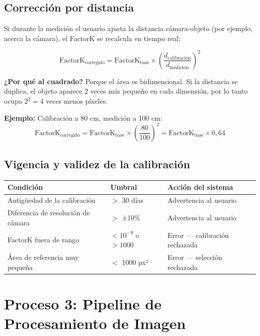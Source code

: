 \documentclass[12pt, a4paper]{article}
\begin{document}
\subsection{Corrección por distancia}

Si durante la medición el usuario ajusta la distancia cámara-objeto
(por ejemplo, acerca la cámara), el FactorK se recalcula en tiempo real:

\begin{formulabox}[title=Corrección cuadrática por distancia]
$$\text{FactorK}_{\text{corregido}} = \text{FactorK}_{\text{base}}
  \times \left(\frac{d_{\text{calibración}}}{d_{\text{medición}}}\right)^2$$

\textbf{¿Por qué al cuadrado?} Porque el área es bidimensional.
Si la distancia se duplica, el objeto aparece 2 veces más pequeño en cada dimensión,
por lo tanto ocupa $2^2 = 4$ veces menos píxeles.
\end{formulabox}

\vspace{0.3cm}

\textbf{Ejemplo:} Calibración a 80 cm, medición a 100 cm:
$$\text{FactorK}_{\text{corregido}} = \text{FactorK}_{\text{base}} \times \left(\frac{80}{100}\right)^2 = \text{FactorK}_{\text{base}} \times 0{,}64$$

\subsection{Vigencia y validez de la calibración}

\begin{center}
\begin{tabular}{lll}
\toprule
\textbf{Condición} & \textbf{Umbral} & \textbf{Acción del sistema} \\
\midrule
Antigüedad de la calibración & $>$ 30 días & Advertencia al usuario \\
Diferencia de resolución de cámara & $>$ ±10\% & Advertencia al usuario \\
FactorK fuera de rango & $<10^{-9}$ o $>1000$ & Error — calibración rechazada \\
Área de referencia muy pequeña & $<$ 1000 px² & Error — selección rechazada \\
\bottomrule
\end{tabular}
\end{center}

\section{Proceso 3: Pipeline de Procesamiento de Imagen}
\end{document}
